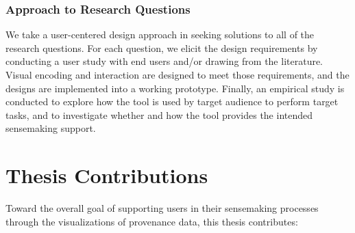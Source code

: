 \subsubsection*{\textbf{Approach to Research Questions}}
We take a user-centered design approach in seeking solutions to all of the research questions. For each question, we elicit the design requirements by conducting a user study with end users and/or drawing from the literature. Visual encoding and interaction are designed to meet those requirements, and the designs are implemented into a working prototype. Finally, an empirical study is conducted to explore how the tool is used by target audience to perform target tasks, and to investigate whether and how the tool provides the intended sensemaking support.

\section{Thesis Contributions}
Toward the overall goal of supporting users in their sensemaking processes through the visualizations of provenance data, this thesis contributes:

